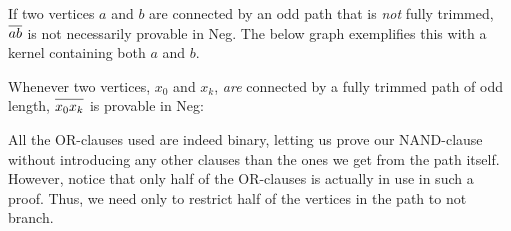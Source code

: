 If two vertices $a$ and $b$ are connected by an odd path that is \textit{not} fully trimmed, $\ol{ab}$ is not necessarily provable in Neg.
The below graph exemplifies this with a kernel containing both $a$ and $b$.\par
\begin{figure}[!h]
  \centering
  \caption{}
  \label{fig:kernel_untrimmed}
\end{figure}
Whenever two vertices, $x_0$ and $x_k$, \textit{are} connected by a fully trimmed path of odd length, $\ol{x_0x_k}$ is provable in Neg:
\begin{figure}[!h]
  \centering
  \begin{prooftree*}
  \end{prooftree*}
\caption{}
\label{fig:proof_x0xk}
\end{figure}
\FloatBarrier
All the OR-clauses used are indeed binary, letting us prove our NAND-clause without introducing any other clauses than the ones we get from the path itself.
However, notice that only half of the OR-clauses is actually in use in such a proof.
Thus, we need only to restrict half of the vertices in the path to not branch.

